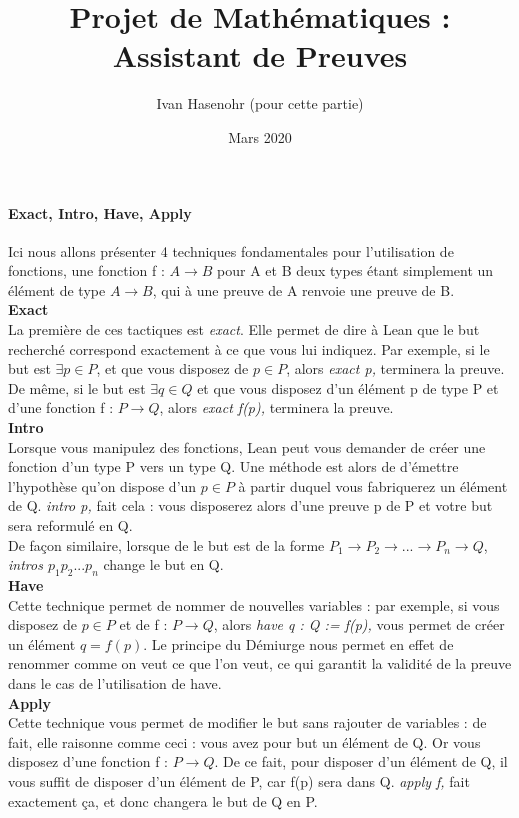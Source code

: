 \documentclass[french,frenchkw]{article}
\title{Projet de Mathématiques : Assistant de Preuves}
\author{Ivan Hasenohr (pour cette partie)}
\date{Mars 2020}
\begin{document}
\maketitle
\paragraph{Exact, Intro, Have, Apply}
Ici nous allons présenter 4 techniques fondamentales pour l'utilisation de fonctions, une fonction f : $A\to B$ pour A et B deux types étant simplement un élément de type $A\to B$, qui à une preuve de A renvoie une preuve de B.\\
\textbf{Exact}\\
La première de ces tactiques est \textit{exact}. Elle permet de dire à Lean que le but recherché correspond exactement à ce que vous lui indiquez. Par exemple, si le but est  $\exists  p \in P$, et que vous disposez de $p \in P$, alors \textit{exact p,} terminera la preuve. De même, si le but est  $\exists  q \in Q$ et que vous disposez d'un élément p de type P et d'une fonction f : $P \to Q$, alors \textit{exact f(p),} terminera la preuve.\\
\textbf{Intro} \\
Lorsque vous manipulez des fonctions, Lean peut vous demander de créer une fonction d'un type P vers un type Q. Une méthode est alors de d'émettre l'hypothèse qu'on dispose d'un $p\in P$ à partir duquel vous fabriquerez un élément de Q. \textit{intro p,} fait cela : vous disposerez alors d'une preuve p de P et votre but sera reformulé en Q. \\
De façon similaire, lorsque de le but est de la forme $P_1 \to P_2 \to ... \to P_n \to Q$, \textit{intros $p_1 p_2 ... p_n$} change le but en Q.\\
\textbf{Have} \\
Cette technique permet de nommer de nouvelles variables : par exemple, si vous disposez de $p \in P$ et de f : $P \to Q$, alors \textit{have q : Q := f(p),} vous permet de créer un élément $q = f(p)$. Le principe du Démiurge nous permet en effet de renommer comme on veut ce que l'on veut, ce qui garantit la validité de la preuve dans le cas de l'utilisation de have. \\
\textbf{Apply}\\
Cette technique vous permet de modifier le but sans rajouter de variables : de fait, elle raisonne comme ceci : vous avez pour but un élément de Q. Or vous disposez d'une fonction f : $P \to Q$. De ce fait, pour disposer d'un élément de Q, il vous suffit de disposer d'un élément de P, car f(p) sera dans Q. \textit{apply f,} fait exactement ça, et donc changera le but de Q en P.\\
\end{document}
